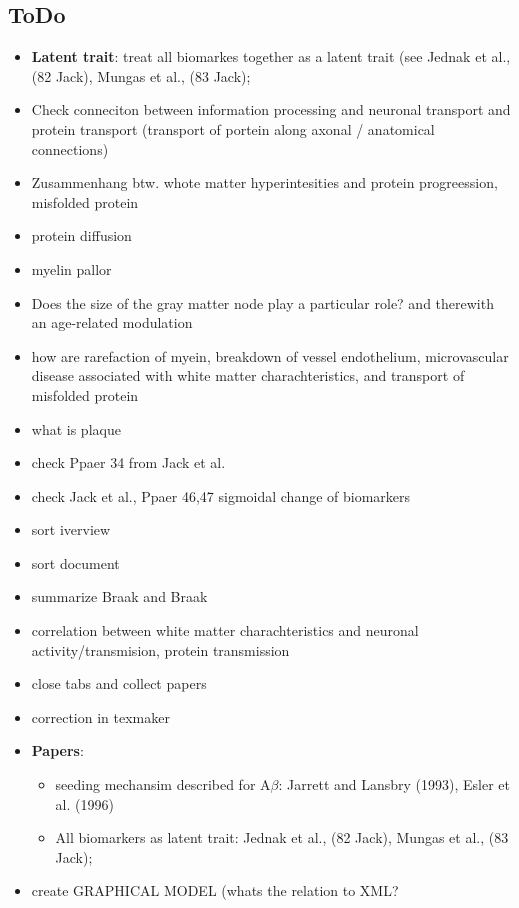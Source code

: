 \documentclass[fleqn]{article}\usepackage{caption}
\begin{document}
\subsection{ToDo}
\begin{itemize}
\item \textbf{Latent trait}: treat all biomarkes together as a latent trait (see Jednak et al., (82 Jack), Mungas et al., (83 Jack); 
\item Check conneciton between information processing and neuronal transport and protein transport (transport of portein along axonal / anatomical connections)
\item Zusammenhang btw. whote matter hyperintesities and protein progreession, misfolded protein
\item protein diffusion
\item myelin pallor
\item Does the size of the gray matter node play a particular role? and therewith an age-related modulation
\item how are rarefaction of myein, breakdown of vessel endothelium, microvascular disease associated with white matter charachteristics, and transport of misfolded protein
\item what is plaque
\item check Ppaer 34 from Jack et al.
\item check Jack et al., Ppaer 46,47 sigmoidal change of biomarkers
\item sort iverview
\item sort document
\item summarize Braak and Braak
\item correlation between white matter charachteristics and neuronal activity/transmision, protein transmission
\item close tabs and collect papers
\item correction in texmaker
\item \textbf{Papers}:
\begin{itemize}
\item seeding mechansim described for A$\beta$: Jarrett and Lansbry (1993), Esler et al. (1996)
\item All biomarkers as latent trait: Jednak et al., (82 Jack), Mungas et al., (83 Jack);
\end{itemize}

\item create GRAPHICAL MODEL (whats the relation to XML?
\end{itemize}
\end{document}
